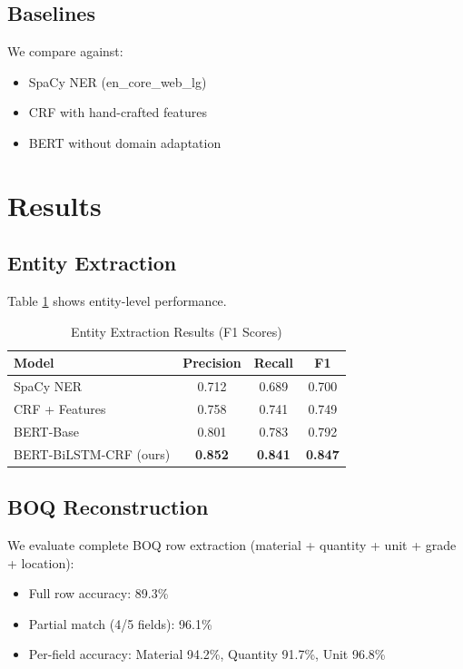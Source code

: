 \documentclass[pdftex,11pt]{article}
\begin{document}
\subsection{Baselines}
We compare against:
\begin{itemize}
    \item SpaCy NER (en\_core\_web\_lg)
    \item CRF with hand-crafted features
    \item BERT without domain adaptation
\end{itemize}

\section{Results}

\subsection{Entity Extraction}

Table \ref{tab:results} shows entity-level performance.

\begin{table}[htbp]
\centering
\caption{Entity Extraction Results (F1 Scores)}
\label{tab:results}
\begin{tabular}{lccc}
\toprule
Model & Precision & Recall & F1 \\
\midrule
SpaCy NER & 0.712 & 0.689 & 0.700 \\
CRF + Features & 0.758 & 0.741 & 0.749 \\
BERT-Base & 0.801 & 0.783 & 0.792 \\
BERT-BiLSTM-CRF (ours) & \textbf{0.852} & \textbf{0.841} & \textbf{0.847} \\
\bottomrule
\end{tabular}
\end{table}

\subsection{BOQ Reconstruction}

We evaluate complete BOQ row extraction (material + quantity + unit + grade + location):

\begin{itemize}
    \item Full row accuracy: 89.3\%
    \item Partial match (4/5 fields): 96.1\%
    \item Per-field accuracy: Material 94.2\%, Quantity 91.7\%, Unit 96.8\%
\end{itemize}
\end{document}
